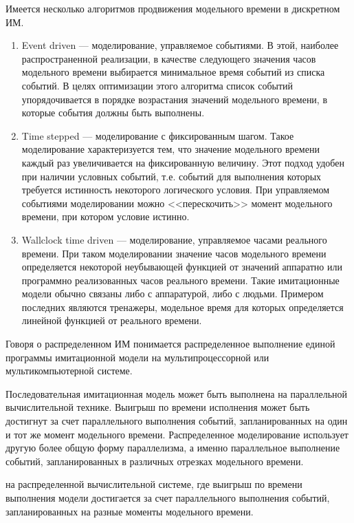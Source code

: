 Имеется несколько алгоритмов продвижения модельного времени в дискретном ИМ.
\begin{enumerate}
\item Event driven --- моделирование, управляемое событиями. В этой, наиболее распространенной реализации, в качестве следующего значения часов модельного времени выбирается минимальное время событий из списка событий. В целях оптимизации этого алгоритма список событий упорядочивается в порядке возрастания значений модельного времени, в которые события должны быть выполнены.
\item Time stepped --- моделирование с фиксированным шагом. Такое моделирование характеризуется тем, что значение модельного времени каждый раз увеличивается на фиксированную величину. Этот подход удобен при наличии условных событий, т.е. событий для выполнения которых требуется истинность некоторого логического условия. При управляемом событиями моделировании можно <<перескочить>> момент модельного времени, при котором условие истинно.
\item Wallclock time driven --- моделирование, управляемое часами реального времени. При таком моделировании значение часов модельного времени определяется некоторой неубывающей функцией от значений аппаратно или программно реализованных часов реального времени. Такие имитационные модели обычно связаны либо с аппаратурой, либо с людьми. Примером последних являются тренажеры, модельное время для которых определяется линейной функцией от реального времени.	
\end{enumerate}

Говоря о распределенном ИМ понимается распределенное выполнение единой программы имитационной модели на мультипроцессорной или мультикомпьютерной системе.

Последовательная имитационная модель может быть выполнена на параллельной вычислительной технике. Выигрыш по времени исполнения может быть достигнут за счет параллельного выполнения событий, запланированных на один и тот же момент модельного времени. Распределенное моделирование использует другую более общую форму параллелизма, а именно параллельное выполнение событий, запланированных в различных отрезках модельного времени.

 на распределенной вычислительной системе, где выигрыш по времени выполнения модели достигается за счет параллельного выполнения событий, запланированных на разные моменты модельного времени.




